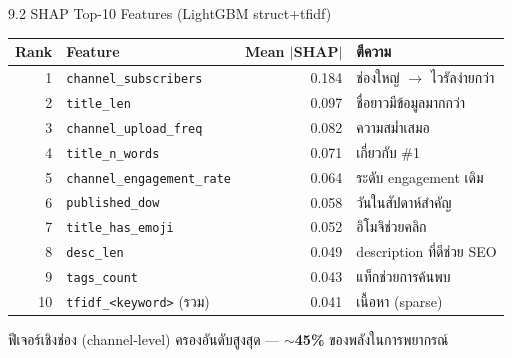 \documentclass[aspectratio=169,11pt,xcolor=dvipsnames]{beamer}
\newcommand{\hl}[1]{\textcolor{kmitlOrange}{\textbf{#1}}}
\begin{document}
\begin{frame}{9.2 SHAP Top-10 Features (LightGBM struct+tfidf)}
  \footnotesize
  \begin{tabular}{rlrl}
    \toprule
    \textbf{Rank} & \textbf{Feature} & \textbf{Mean $|$SHAP$|$} & \textbf{ตีความ}\\
    \midrule
    1  & \texttt{channel\_subscribers}     & 0.184 & ช่องใหญ่ $\rightarrow$ ไวรัลง่ายกว่า\\
    2  & \texttt{title\_len}                & 0.097 & ชื่อยาวมีข้อมูลมากกว่า\\
    3  & \texttt{channel\_upload\_freq}     & 0.082 & ความสม่ำเสมอ\\
    4  & \texttt{title\_n\_words}           & 0.071 & เกี่ยวกับ \#1\\
    5  & \texttt{channel\_engagement\_rate} & 0.064 & ระดับ engagement เดิม\\
    6  & \texttt{published\_dow}            & 0.058 & วันในสัปดาห์สำคัญ\\
    7  & \texttt{title\_has\_emoji}         & 0.052 & อิโมจิช่วยคลิก\\
    8  & \texttt{desc\_len}                 & 0.049 & description ที่ดีช่วย SEO\\
    9  & \texttt{tags\_count}               & 0.043 & แท็กช่วยการค้นพบ\\
    10 & \texttt{tfidf\_<keyword>} (รวม)    & 0.041 & เนื้อหา (sparse)\\
    \bottomrule
  \end{tabular}
  \vspace{0.4em}
  \begin{center}
    \scriptsize ฟีเจอร์เชิงช่อง (channel-level) ครองอันดับสูงสุด — \hl{$\sim$45\%} ของพลังในการพยากรณ์
  \end{center}
\end{frame}
\end{document}
